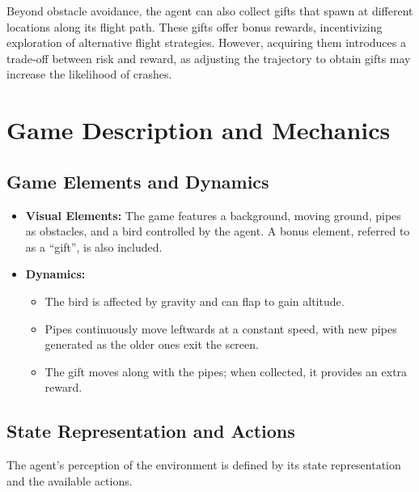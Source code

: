 \documentclass[conference]{IEEEtran}
\begin{document}
Beyond obstacle avoidance, the agent can also collect gifts that spawn at different locations along its flight path. These gifts offer bonus rewards, incentivizing exploration of alternative flight strategies. However, acquiring them introduces a trade-off between risk and reward, as adjusting the trajectory to obtain gifts may increase the likelihood of crashes.

\section{Game Description and Mechanics}

\subsection{Game Elements and Dynamics}
\begin{itemize}
    \item \textbf{Visual Elements:} The game features a background, moving ground, pipes as obstacles, and a bird controlled by the agent. A bonus element, referred to as a “gift”, is also included.
    \item \textbf{Dynamics:}
    \begin{itemize}
        \item The bird is affected by gravity and can flap to gain altitude.
        \item Pipes continuously move leftwards at a constant speed, with new pipes generated as the older ones exit the screen.
        \item The gift moves along with the pipes; when collected, it provides an extra reward.
    \end{itemize}
\end{itemize}

\subsection{State Representation and Actions}
The agent's perception of the environment is defined by its state representation and the available actions.
\end{document}
